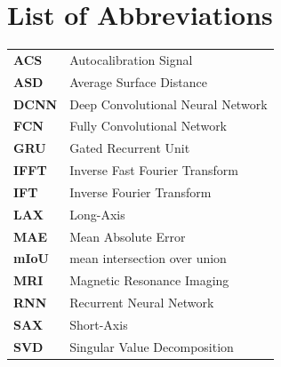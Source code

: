 \documentclass[12pt,a4paper]{article}
\begin{document}
\newpage
{}
\tableofcontents

\section*{List of Abbreviations}
\vspace{2em}
\begingroup
\setlength{\tabcolsep}{14pt}
\renewcommand{\arraystretch}{2}
\noindent
\begin{tabularx}{\textwidth}{>{\bfseries}m{8cm} X}
ACS  & Autocalibration Signal \\
ASD  & Average Surface Distance \\
DCNN & Deep Convolutional Neural Network \\
FCN  & Fully Convolutional Network \\
GRU  & Gated Recurrent Unit \\
IFFT & Inverse Fast Fourier Transform \\
IFT  & Inverse Fourier Transform \\
LAX  & Long-Axis \\
MAE  & Mean Absolute Error \\
mIoU & mean intersection over union \\
MRI  & Magnetic Resonance Imaging \\
RNN  & Recurrent Neural Network \\
SAX  & Short-Axis \\
SVD  & Singular Value Decomposition \\
\end{tabularx}
\endgroup



\newpage
\clearpage
{}

\end{document}
